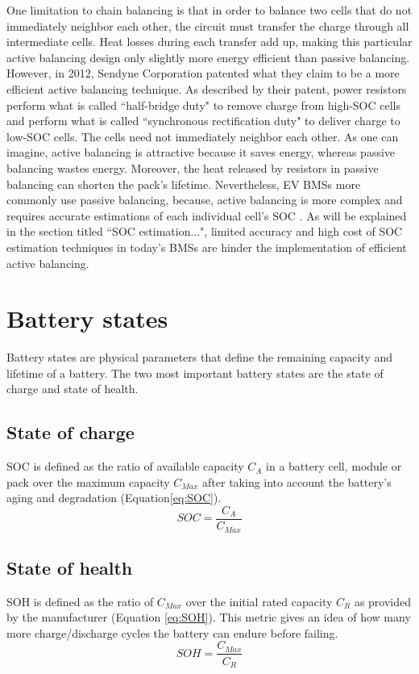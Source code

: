 One limitation to chain balancing  is that in order to balance two cells that do not immediately neighbor each other, the circuit must transfer the charge through all intermediate cells. Heat losses during each transfer add up, making this particular active balancing design only slightly more energy efficient than passive balancing. However, in 2012, Sendyne Corporation patented what they claim to be a more efficient active balancing technique. As described by their patent, power resistors perform what is called ``half-bridge duty" to remove charge from high-SOC cells and perform what is called ``synchronous rectification duty" to deliver charge to low-SOC cells. The cells need not immediately neighbor each other. 
As one can imagine,  active balancing is attractive because it saves energy, whereas passive balancing wastes energy. Moreover, the heat released by resistors in passive balancing can shorten the pack's lifetime. Nevertheless, EV BMSs more commonly use passive balancing, because, active balancing is more complex and requires accurate estimations of each individual cell's SOC \cite[p.~284]{LanguangLuXuebingHanJianqiuLiJianfengHua2013}. As will be explained in the section titled ``SOC estimation...", limited accuracy and high cost of SOC estimation techniques in today's BMSs are hinder the implementation of efficient active balancing.
	\section{Battery states}
Battery states are physical parameters that define the remaining capacity and lifetime of a battery. The two most important battery states are the state of charge and state of health.%
		\subsection{State of charge}
SOC is defined as the ratio of available capacity $C_{A}$ in a battery cell, module or pack over the maximum capacity $C_{Max}$ after taking into account the battery's aging and degradation (Equation\ref{eq:SOC}).
\begin{equation}\label{eq:SOC}
SOC = \frac{C_{A}}{C_{Max}}
\end{equation}
		\subsection{State of health}
SOH is defined as the ratio of $C_{Max}$ over the initial rated capacity $C_{R}$ as provided by the manufacturer (Equation \ref{eq:SOH}). This metric gives an idea of how many more charge/discharge cycles the battery can endure before failing. 
\begin{equation}\label{eq:SOH}
SOH = \frac{C_{Max}}{C_{R}}
\end{equation}

